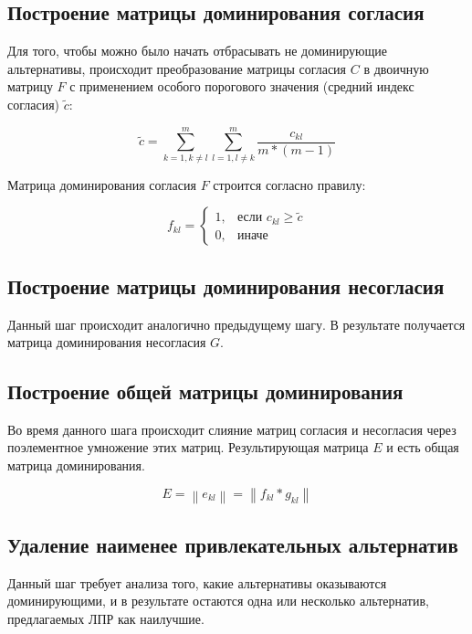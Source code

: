 \documentclass{article}
\begin{document}
    \subsection{Построение матрицы доминирования согласия}
        Для того, чтобы можно было начать отбрасывать не доминирующие альтернативы, происходит
        преобразование матрицы согласия \(C\) в двоичную матрицу \(F\) с применением особого
        порогового значения (средний индекс согласия) \(\widetilde{c}\):

        \begin{equation}
            \widetilde{c} = \sum_{k=1, k \neq l}^{m}\sum_{l=1, l \neq k}^{m}
            \frac{c_{kl}}{m*(m-1)}
        \end{equation}

        Матрица доминирования согласия \(F\) строится согласно правилу:

        \begin{equation}
            f_{kl} = \begin{cases}
                1,& \text{если } c_{kl}\geq \widetilde{c}\\
                0,              & \text{иначе}
            \end{cases}
        \end{equation}

    \subsection{Построение матрицы доминирования несогласия}
        Данный шаг происходит аналогично предыдущему шагу. В результате получается матрица
        доминирования несогласия \(G\).

    \subsection{Построение общей матрицы доминирования}
        Во время данного шага происходит слияние матриц согласия и несогласия через поэлементное
        умножение этих матриц. Результирующая матрица \(E\) и есть общая матрица доминирования.

        \begin{equation}
            E = \left \| e_{kl} \right \| = \left \| f_{kl} * g_{kl}\right \|
        \end{equation}


    \subsection{Удаление наименее привлекательных альтернатив}
        Данный шаг требует анализа того, какие альтернативы оказываются доминирующими, и в
        результате остаются одна или несколько альтернатив, предлагаемых ЛПР как наилучшие.



\end{document}
